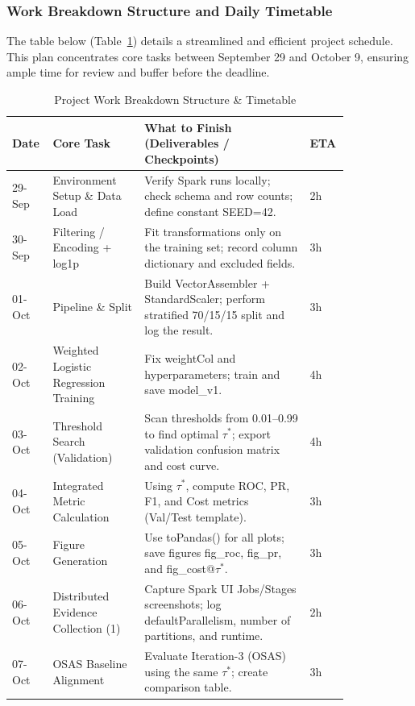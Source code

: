 \documentclass[sigplan,screen]{acmart}
\begin{document}
\subsubsection{Work Breakdown Structure and Daily Timetable}

The table below (Table~\ref{tab:project-schedule}) details a streamlined and efficient project schedule. This plan concentrates core tasks between September 29 and October 9, ensuring ample time for review and buffer before the deadline.

\begin{table}[h]
\caption{Project Work Breakdown Structure \& Timetable}
\label{tab:project-schedule}
\footnotesize
\begin{tabular}{|p{0.07\linewidth}|p{0.25\linewidth}|p{0.45\linewidth}|p{0.06\linewidth}|}
\hline
\textbf{Date} & \textbf{Core Task} & \textbf{What to Finish (Deliverables / Checkpoints)} & \textbf{ETA} \\
\hline
29-Sep & Environment Setup \& Data Load & Verify Spark runs locally; check schema and row counts; define constant SEED=42. & 2h \\
\hline
30-Sep & Filtering / Encoding + log1p & Fit transformations only on the training set; record column dictionary and excluded fields. & 3h \\
\hline
01-Oct & Pipeline \& Split & Build Vector\allowbreak Assembler + Standard\allowbreak Scaler; perform stratified 70/15/15 split and log the result. & 3h \\
\hline
02-Oct & Weighted Logistic Regression Training & Fix weightCol and hyperparameters; train and save model\_v1. & 4h \\
\hline
03-Oct & Threshold Search (Validation) & Scan thresholds from 0.01--0.99 to find optimal $\tau^*$; export validation confusion matrix and cost curve. & 4h \\
\hline
04-Oct & Integrated Metric Calculation & Using $\tau^*$, compute ROC, PR, F1, and Cost metrics (Val/Test template). & 3h \\
\hline
05-Oct & Figure Generation & Use toPandas() for all plots; save figures fig\_roc, fig\_pr, and fig\_cost@$\tau^*$. & 3h \\
\hline
06-Oct & Distributed Evidence Collection (1) & Capture Spark UI Jobs/Stages screenshots; log default\allowbreak Parallelism, number of partitions, and runtime. & 2h \\
\hline
07-Oct & OSAS Baseline Alignment & Evaluate Iteration-3 (OSAS) using the same $\tau^*$; create comparison table. & 3h \\

\end{tabular}
\end{table}
\end{document}
